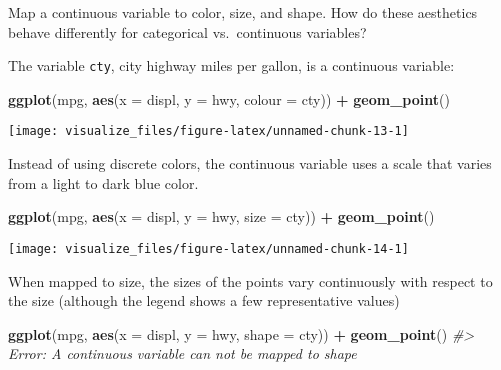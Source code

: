 \documentclass[]{book}
\newenvironment{Shaded}{\begin{snugshade}}{\end{snugshade}}
\newcommand{\CommentTok}[1]{\textcolor[rgb]{0.56,0.35,0.01}{\textit{#1}}}
\newcommand{\DataTypeTok}[1]{\textcolor[rgb]{0.13,0.29,0.53}{#1}}
\newcommand{\KeywordTok}[1]{\textcolor[rgb]{0.13,0.29,0.53}{\textbf{#1}}}
\newcommand{\NormalTok}[1]{#1}
\newcommand{\OperatorTok}[1]{\textcolor[rgb]{0.81,0.36,0.00}{\textbf{#1}}}
\newcommand{\StringTok}[1]{\textcolor[rgb]{0.31,0.60,0.02}{#1}}
\theoremstyle{plain}
\theoremstyle{remark}
\begin{document}
Map a continuous variable to color, size, and shape. How do these
aesthetics behave differently for categorical vs.~continuous variables?

The variable \texttt{cty}, city highway miles per gallon, is a
continuous variable:

\begin{Shaded}
\begin{Highlighting}[]
\KeywordTok{ggplot}\NormalTok{(mpg, }\KeywordTok{aes}\NormalTok{(}\DataTypeTok{x =}\NormalTok{ displ, }\DataTypeTok{y =}\NormalTok{ hwy, }\DataTypeTok{colour =}\NormalTok{ cty)) }\OperatorTok{+}
\StringTok{  }\KeywordTok{geom_point}\NormalTok{()}
\end{Highlighting}
\end{Shaded}

\begin{center}\texttt{[image: visualize\_files/figure-latex/unnamed-chunk-13-1]} \end{center}

Instead of using discrete colors, the continuous variable uses a scale
that varies from a light to dark blue color.

\begin{Shaded}
\begin{Highlighting}[]
\KeywordTok{ggplot}\NormalTok{(mpg, }\KeywordTok{aes}\NormalTok{(}\DataTypeTok{x =}\NormalTok{ displ, }\DataTypeTok{y =}\NormalTok{ hwy, }\DataTypeTok{size =}\NormalTok{ cty)) }\OperatorTok{+}
\StringTok{  }\KeywordTok{geom_point}\NormalTok{()}
\end{Highlighting}
\end{Shaded}

\begin{center}\texttt{[image: visualize\_files/figure-latex/unnamed-chunk-14-1]} \end{center}

When mapped to size, the sizes of the points vary continuously with
respect to the size (although the legend shows a few representative
values)

\begin{Shaded}
\begin{Highlighting}[]
\KeywordTok{ggplot}\NormalTok{(mpg, }\KeywordTok{aes}\NormalTok{(}\DataTypeTok{x =}\NormalTok{ displ, }\DataTypeTok{y =}\NormalTok{ hwy, }\DataTypeTok{shape =}\NormalTok{ cty)) }\OperatorTok{+}
\StringTok{  }\KeywordTok{geom_point}\NormalTok{()}
\CommentTok{#> Error: A continuous variable can not be mapped to shape}
\end{Highlighting}
\end{Shaded}
\end{document}
